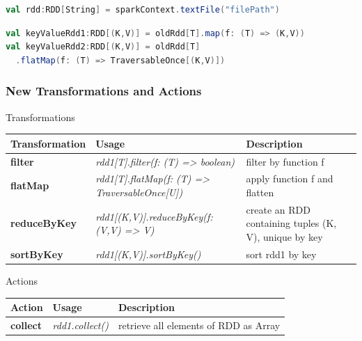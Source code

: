 \documentclass[slidetop,9pt,utf8]{beamer}
\begin{document}
\begin{CJK}{UTF8}{gbsn}
\begin{frame}[fragile]
  \begin{lstlisting}[label=LoadTextFile, caption=Load Text File, language=scala, style=code]
val rdd:RDD[String] = sparkContext.textFile("filePath")
  \end{lstlisting}

  \begin{lstlisting}[label=TransformToKeyValue, caption=Transform RDD to a Key/Value RDD (Also called PairRDD), language=scala, style=code]
val keyValueRdd1:RDD[(K,V)] = oldRdd[T].map(f: (T) => (K,V))
val keyValueRdd2:RDD[(K,V)] = oldRdd[T]
  .flatMap(f: (T) => TraversableOnce[(K,V)])
  \end{lstlisting}

\end{frame}

\begin{frame}

  \frametitle{New Transformations and Actions}

  \begin{block}{Transformations}
    \begin{center}
      \begin{tabular}{|m{2.0cm}|m{4.0cm}|m{4.9cm}|}
        \hline 
        \rowcolor{gray} \textbf{Transformation} & \textbf{Usage} & \textbf{Description} \\ \hline
        \textbf{filter} & \textit{rdd1[T]\newline.filter(f: (T) =\textgreater\xspace boolean)} & filter by function f \\ \hline
        \textbf{flatMap} & \textit{rdd1[T].flatMap(f: (T) =\textgreater\xspace TraversableOnce[U])} & apply function f and flatten \\ \hline
        \textbf{reduceByKey} & \textit{rdd1[(K,V)]\newline.reduceByKey(f:(V,V) =\textgreater\xspace V)} & create an RDD containing tuples (K, V), unique by key \\ \hline
        \textbf{sortByKey} & \textit{rdd1[(K,V)].sortByKey()} & sort rdd1 by key \\ \hline
      \end{tabular}
    \end{center}
  \end{block}

  \begin{block}{Actions}
    \begin{center}
      \begin{tabular}{|m{2.0cm}|m{4.0cm}|m{4.9cm}|}
        \hline 
        \rowcolor{gray} \textbf{Action} & \textbf{Usage} & \textbf{Description} \\ \hline
        \textbf{collect} & \textit{rdd1.collect()} & retrieve all elements of RDD as Array \\ \hline
      \end{tabular}
    \end{center}
  \end{block}


\end{frame}
\end{CJK}
\end{document}
